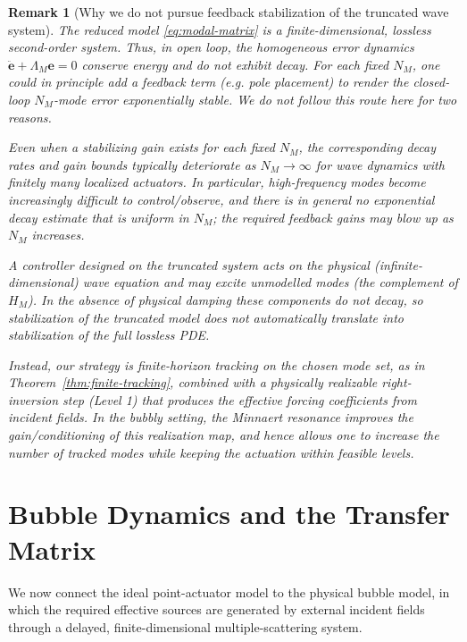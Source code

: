 \documentclass[11pt,a4paper]{article}
\numberwithin{equation}{section}
\newtheorem{remark}[theorem]{Remark}
\begin{document}
\begin{remark}[Why we do not pursue feedback stabilization of the truncated wave system]\label{rem:no-feedback}
The reduced model \eqref{eq:modal-matrix} is a finite-dimensional, \emph{lossless} second-order system.
Thus, in open loop, the homogeneous error dynamics $\ddot{\bm e}+\Lambda_M \bm e=0$ conserve energy and
do not exhibit decay. For each fixed $N_M$, one could in principle add a feedback term (e.g. pole placement)
to render the closed-loop $N_M$-mode error exponentially stable.
We do not follow this route here for two reasons.

\smallskip
{}
Even when a stabilizing gain exists for each fixed $N_M$, the corresponding decay rates and gain bounds typically
deteriorate as $N_M\to\infty$ for wave dynamics with finitely many localized actuators. In particular, high-frequency
modes become increasingly difficult to control/observe, and there is in general no exponential decay estimate that is
\emph{uniform} in $N_M$; the required feedback gains may blow up as $N_M$ increases.

\smallskip
{}
A controller designed on the truncated system acts on the physical (infinite-dimensional) wave equation and may excite
unmodelled modes (the complement of $H_M$). In the absence of physical damping these components do not decay, so
stabilization of the truncated model does not automatically translate into stabilization of the full lossless PDE.

\smallskip
\noindent
Instead, our strategy is \emph{finite-horizon tracking} on the chosen mode set, as in Theorem~\ref{thm:finite-tracking},
combined with a physically realizable right-inversion step (Level 1) that produces the effective forcing coefficients from incident
fields. In the bubbly setting, the Minnaert resonance improves the gain/conditioning of this realization map, and hence
allows one to increase the number of tracked modes while keeping the actuation within feasible levels.
\end{remark}



\section{Bubble Dynamics and the Transfer Matrix}\label{sec:bubble-transfer}
\label{sec:bubble-R3}


\noindent
We now connect the ideal point-actuator model to the physical bubble model, in which the required effective sources are generated by external incident fields through a delayed, finite-dimensional multiple-scattering system.
\end{document}
